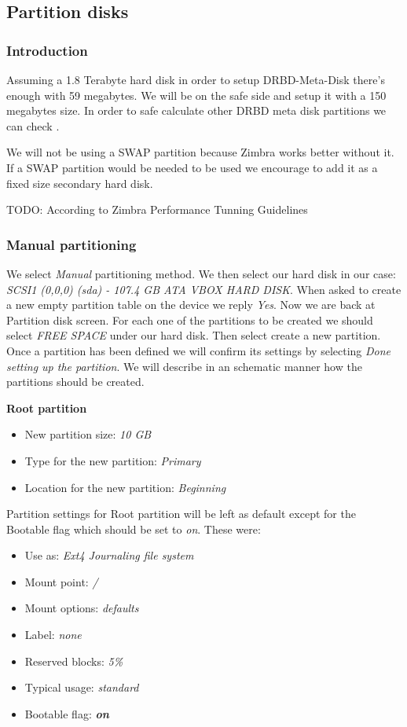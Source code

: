 \subsection {Partition disks}
\subsubsection {Introduction}
Assuming a 1.8 Terabyte hard disk in order to setup DRBD-Meta-Disk there's enough with 59 megabytes. We will be on the safe side and setup it with a 150 megabytes size. In order to safe calculate other DRBD meta disk partitions we can check \cite{LinbitDRBDInternals}.

We will not be using a SWAP partition because Zimbra works better without it. If a SWAP partition would be needed to be used we encourage to add it as a fixed size secondary hard disk.

TODO: According to Zimbra Performance Tunning Guidelines

\subsubsection {Manual partitioning}
We select \textit{Manual} partitioning method. We then select our hard disk in our case: \textit{SCSI1 (0,0,0) (sda) - 107.4 GB ATA VBOX HARD DISK}. When asked to create a new empty partition table on the device we reply \textit{Yes}.
Now we are back at Partition disk screen. For each one of the partitions to be created we should select \textit{FREE SPACE} under our hard disk. Then select create a new partition.  Once a partition has been defined we will confirm its settings by selecting \textit{Done setting up the partition}. We will describe in an schematic manner how the partitions should be created.

\textbf{Root partition}
\begin{itemize}
  \item New partition size: \textit{10 GB}
  \item Type for the new partition: \textit {Primary}
  \item Location for the new partition: \textit{Beginning}
\end{itemize}
Partition settings for Root partition will be left as default except for the Bootable flag which should be set to \textit{on}. These were:
\begin{itemize}
  \item Use as: \textit{Ext4 Journaling file system}
  \item Mount point: \textit{/}
  \item Mount options: \textit{defaults}
  \item Label:	\textit{none}
  \item Reserved blocks: \textit{5\%}
  \item Typical usage: \textit{standard}
  \item Bootable flag: \textbf{\textit{on}}
\end{itemize}


